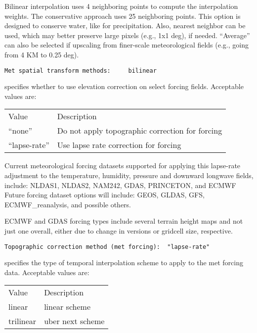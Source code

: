 Bilinear interpolation uses 4 neighboring points to compute the
 interpolation weights. The conservative approach uses 25 neighboring
 points.  This option is designed to conserve water, like for
 precipitation.
 Also, nearest neighbor can be used, which may
 better preserve large pixels (e.g., 1x1 deg), if needed. ``Average''
 can also be selected if upscaling from finer-scale meteorological
 fields (e.g., going from 4 KM to 0.25 deg).
 

 \begin{Verbatim}[frame=single]
Met spatial transform methods:     bilinear
 \end{Verbatim}

 
  specifies whether
 to use elevation correction on select forcing fields.
 Acceptable values are:

 \begin{tabular}{ll}
 Value & Description                                               \\
 ``none''        & Do not apply topographic correction for forcing \\
 ``lapse-rate''  & Use lapse rate correction for forcing           \\
 \end{tabular}

 Current meteorological forcing datasets supported for applying this
 lapse-rate adjustment to the temperature, humidity, pressure and 
 downward longwave fields, include:
   NLDAS1, NLDAS2, NAM242, GDAS, PRINCETON, and ECMWF
 Future forcing dataset options will include: GEOS, GLDAS, GFS,
 ECMWF\_reanalysis, and possible others.

  ECMWF and GDAS forcing types include several terrain height maps
 and not just one overall, either due to change in versions or
 gridcell size, respective.
 

 \begin{Verbatim}[frame=single]
Topographic correction method (met forcing):  "lapse-rate"
 \end{Verbatim}

 
 specifies the type of temporal interpolation scheme to 
 apply to the met forcing data.
 Acceptable values are:

 \begin{tabular}{ll}
 Value     & Description                      \\
 linear    & linear scheme                    \\
 trilinear & uber next scheme                 \\
 \end{tabular}

